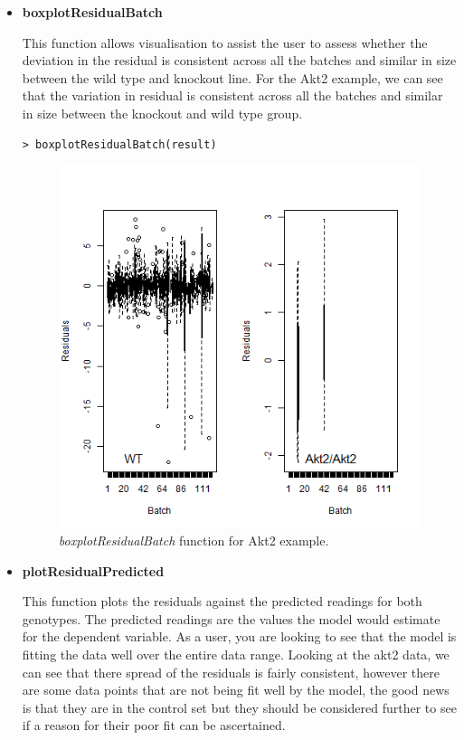 \documentclass[12pt,a4paper]{article}
\begin{document}
\begin{itemize}
\item \textbf{boxplotResidualBatch} 

This function allows visualisation to assist the user to assess whether the deviation in the residual is consistent across all the batches and similar in size between the wild type and knockout line. 
For the Akt2 example, we can see that the variation in residual is consistent across all the batches and similar in size between the knockout and wild type group.

\begingroup
    \fontsize{8pt}{12pt}\selectfont
\begin{verbatim}
> boxplotResidualBatch(result)
\end{verbatim}
\endgroup 

\begin{figure}[H]%
\centerline{\includegraphics[scale=0.5]{cs1_boxplotResidualBatch.png}}
\caption{\textit{boxplotResidualBatch} function for Akt2 example.}\label{fig:17}
\end{figure}


\item \textbf{plotResidualPredicted} 

This function plots the residuals against the predicted readings for both genotypes.  The predicted readings are the values the model would estimate for the dependent variable.  
As a user, you are looking to see that the model is fitting the data well over the entire data range. 
Looking at the akt2 data, we can see that there spread of the residuals is fairly consistent, 
however there are some data points that are not being fit well by the model, the good news is that they are in the control set but they should be considered further to see if a reason for their poor fit can be ascertained.  


\end{itemize}
\end{document}
